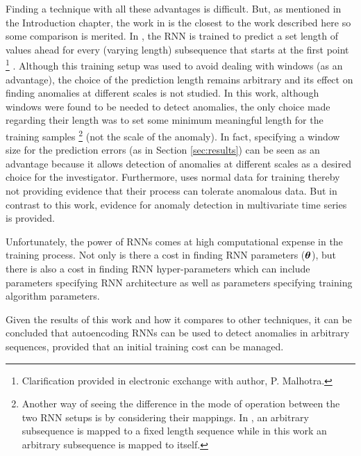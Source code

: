 Finding a technique with all these advantages is difficult.
%
But, as mentioned in the Introduction chapter, the work in \cite{Malhotra2015} is the closest to the work described here so some comparison is merited.
%
In \cite{Malhotra2015}, the RNN is trained to predict a set length of values ahead for every (varying length) subsequence that starts at the first point%
\footnote{Clarification provided in electronic exchange with author, P. Malhotra.}%
.
%
Although this training setup was used to avoid dealing with windows (as an advantage), the choice of the prediction length remains arbitrary and its effect on finding anomalies at different scales is not studied.
%
In this work, although windows were found to be needed to detect anomalies, the only choice made regarding their length was to set some minimum meaningful length for the training samples%
\footnote{Another way of seeing the difference in the mode of operation between the two RNN setups is by considering their mappings. In \cite{Malhotra2015}, an arbitrary subsequence is mapped to a fixed length sequence while in this work an arbitrary subsequence is mapped to itself.}
(not the scale of the anomaly).
%
In fact, specifying a window size for the prediction errors (as in Section \ref{sec:results}) can be seen as an advantage because it allows detection of anomalies at different scales as a desired choice for the investigator.
%
Furthermore, \cite{Malhotra2015} uses normal data for training thereby not providing evidence that their process can tolerate anomalous data.
%
But in contrast to this work, evidence for anomaly detection in multivariate time series is provided.

Unfortunately, the power of RNNs comes at high computational expense in the training process.
%
Not only is there a cost in finding RNN parameters ($\boldsymbol{\theta}$), but there is also a cost in finding RNN hyper-parameters which can include parameters specifying RNN architecture as well as parameters specifying training algorithm parameters.


Given the results of this work and how it compares to other techniques, it can be concluded that autoencoding RNNs can be used to detect anomalies in arbitrary sequences, provided that an initial training cost can be managed.


